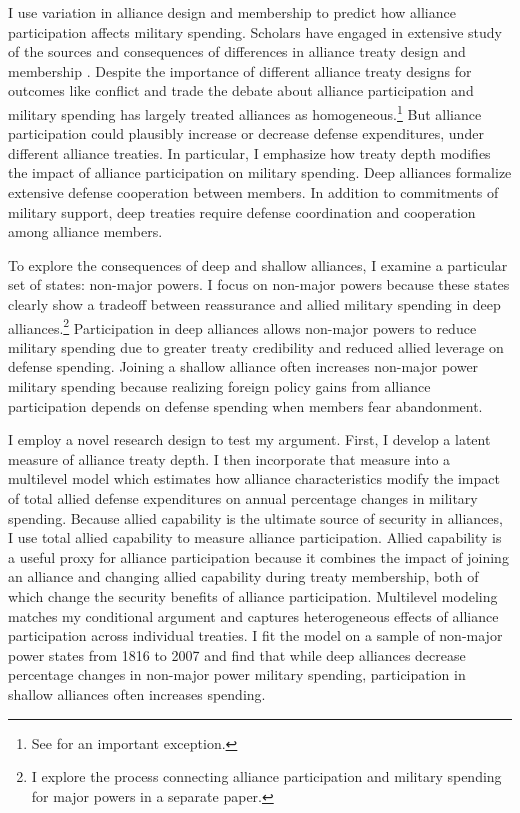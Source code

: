 \documentclass[12pt]{article}
\begin{document}
I use variation in alliance design and membership to predict how alliance participation affects military spending. 
Scholars have engaged in extensive study of the sources and consequences of differences in alliance treaty design and membership \citep{Mattes2012, Benson2012, Poast2019a, Morrow1991, Leeds2003, LeedsAnac2005, Fordham2010, Mattes2012,  Poast2013, Johnsonetal2015}. 
Despite the importance of different alliance treaty designs for outcomes like conflict \citep{Leeds2003, Benson2012} and trade \citep{Long2003, LongLeeds2006} the debate about alliance participation and military spending has largely treated alliances as homogeneous.\footnote{See \citet{DigiuseppePoast2016} for an important exception.}
But alliance participation could plausibly increase or decrease defense expenditures, under different alliance treaties. 
In particular, I emphasize how treaty depth modifies the impact of alliance participation on military spending. 
Deep alliances formalize extensive defense cooperation between members. 
In addition to commitments of military support, deep treaties require defense coordination and cooperation among alliance members. 


To explore the consequences of deep and shallow alliances, I examine a particular set of states: non-major powers. 
I focus on non-major powers because these states clearly show a tradeoff between reassurance and allied military spending in deep alliances.\footnote{I explore the process connecting alliance participation and military spending for major powers in a separate paper.} 
Participation in deep alliances allows non-major powers to reduce military spending due to greater treaty credibility and reduced allied leverage on defense spending. 
Joining a shallow alliance often increases non-major power military spending because realizing foreign policy gains from alliance participation depends on defense spending when members fear abandonment.

 
I employ a novel research design to test my argument.
First, I develop a latent measure of alliance treaty depth. 
I then incorporate that measure into a multilevel model which estimates how alliance characteristics modify the impact of total allied defense expenditures on annual percentage changes in military spending.
Because allied capability is the ultimate source of security in alliances, I use total allied capability to measure alliance participation.  
Allied capability is a useful proxy for alliance participation because it combines the impact of joining an alliance and changing allied capability during treaty membership, both of which change the security benefits of alliance participation. 
Multilevel modeling matches my conditional argument and captures heterogeneous effects of alliance participation across individual treaties. 
I fit the model on a sample of non-major power states from 1816 to 2007 and find that while deep alliances decrease percentage changes in non-major power military spending, participation in shallow alliances often increases spending.
\end{document}

